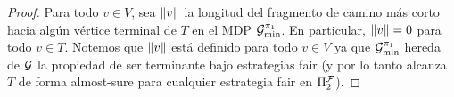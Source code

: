 \begin{proof}

  
  Para todo $v\in V$, sea ${\lVert{v}\rVert}$ la longitud del fragmento de camino más corto hacia algún vértice terminal de $T$ en el MDP
  $\mathcal{G}^{\pi_{1}}_{\min}$.   En particular, ${\lVert{v}\rVert}=0$ para todo $v\in T$.  Notemos que ${\lVert{v}\rVert}$ está definido para todo
  $v\in V$ ya que $\mathcal{G}^{\pi_{1}}_{\min}$ hereda de $\mathcal{G}$ la
  propiedad de ser terminante bajo estrategias fair (y por lo tanto alcanza
  $T$ de forma almost-sure para cualquier estrategia fair en $\Pi^{\mathcal{F}}_{2}$).
  

\end{proof}

